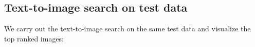 \documentclass[12pt]{report}	%
\begin{document}

\begin{figure}[H]
\centering
{}
 \caption{}
\label{fig:inria-dataset}
\end{figure} 

\begin{figure}[H]
\centering
{}
\label{fig:inria-dataset}
\end{figure} 


\subsection{Text-to-image search on test data}
We carry out the text-to-image search on the same test data and visualize the top ranked images:
\end{document}
